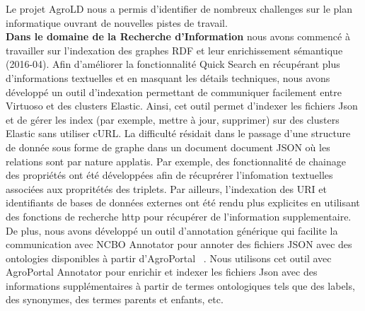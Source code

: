Le projet AgroLD nous a permis d’identifier de nombreux challenges sur le plan informatique ouvrant de nouvelles pistes de travail. \\
\textbf{Dans le domaine de la Recherche d’Information} nous avons commencé à travailler sur l’indexation des graphes RDF et leur enrichissement sémantique (2016-04). Afin d'améliorer la fonctionnalité Quick Search en récupérant plus d'informations textuelles et en masquant les détails techniques, nous avons développé un outil d'indexation permettant de communiquer facilement entre Virtuoso et des clusters Elastic. Ainsi, cet outil permet d’indexer les fichiers Json et de gérer les index (par exemple, mettre à jour, supprimer) sur des clusters Elastic sans utiliser cURL. La difficulté résidait dans le passage d'une structure de donnée sous forme de graphe dans un document document JSON où les relations sont par nature applatis. Par exemple, des fonctionnalité de chainage des propriétés ont été développées afin de récuprérer l'infomation textuelles associées aux propritétés des triplets. Par ailleurs, l'indexation des URI et identifiants de bases de données externes ont été rendu plus explicites en utilisant des fonctions de recherche http pour récupérer de l'information supplementaire. De plus, nous avons développé un outil d'annotation générique qui facilite la communication avec NCBO Annotator pour annoter des fichiers JSON avec des ontologies disponibles à partir d'AgroPortal ~\cite{Jonquet2018}. Nous utilisons cet outil avec AgroPortal Annotator pour enrichir et indexer les fichiers Json avec des informations supplémentaires à partir de termes ontologiques tels que des labels, des synonymes, des termes parents et enfants, etc.

